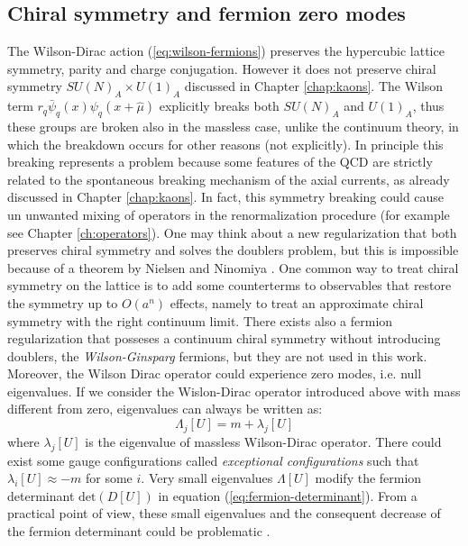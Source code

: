 \documentclass[english, LaM, oneside, noexaminfo]{sapthesis}
\begin{document}
\subsection{Chiral symmetry and fermion zero modes}\label{subsec:zero-modes}
\noindent
The Wilson-Dirac action (\ref{eq:wilson-fermions}) preserves the hypercubic lattice symmetry, parity and charge conjugation.
However it does not preserve chiral symmetry $SU(N)_A \times U(1)_A$ discussed in Chapter \ref{chap:kaons}.
The Wilson term $r_q \bar \psi_q(x) \psi_q (x + \hat \mu)$ explicitly breaks both $SU(N)_A$ and $U(1)_A$, thus these groups are broken also in the massless case, unlike the continuum theory, in which the breakdown occurs for other reasons (not explicitly).
In principle this breaking represents a problem because some features of the QCD are strictly related to the spontaneous breaking mechanism of the axial currents, as already discussed in Chapter \ref{chap:kaons}.
In fact, this symmetry breaking could cause un unwanted mixing of operators in the renormalization procedure (for example see Chapter \ref{ch:operators}).
One may think about a new regularization that both preserves chiral symmetry and solves the doublers problem, but this is impossible because of a theorem by Nielsen and Ninomiya \cite{montvay-munster}.
One common way to treat chiral symmetry on the lattice is to add some counterterms to observables that restore the symmetry up to $O(a^n)$ effects, namely to treat an approximate chiral symmetry with the right continuum limit.
There exists also a fermion regularization that posseses a continuum chiral symmetry without introducing doublers, the {\it Wilson-Ginsparg} fermions, but they are not used in this work.
\newline
Moreover, the Wilson Dirac operator could experience zero modes, i.e. null eigenvalues.
If we consider the Wislon-Dirac operator introduced above with mass different from zero, eigenvalues can always be written as:
\begin{equation}\label{eq:eigenvalues}
    \Lambda_j [U] = m + \lambda_j [U]
\end{equation}
where $\lambda_j [U]$ is the eigenvalue of massless Wilson-Dirac operator.
There could exist some gauge configurations called {\it exceptional configurations} such that $\lambda_i [U] \approx -m$ for some $i$. 
Very small eigenvalues $\Lambda [U]$ modify the fermion determinant $\text{det}(D[U])$ in equation (\ref{eq:fermion-determinant}).
From a practical point of view, these small eigenvalues and the consequent decrease of the fermion determinant could be problematic \cite{tmLQCD}.
\end{document}
